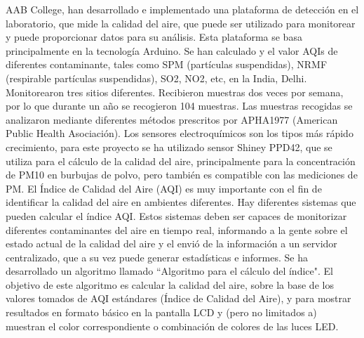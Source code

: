 \documentclass[10pt,a4paper]{article}
\begin{document}
\begin{multicols}{2}
\begin{itemize}
AAB College, han desarrollado e implementado una
plataforma de detección en el laboratorio, que mide la
calidad del aire, que puede ser utilizado para monitorear
y puede proporcionar datos para su análisis. Esta
plataforma se basa principalmente en la tecnología  Arduino.
Se han calculado y el valor AQIs de diferentes
contaminante, tales como SPM (partículas suspendidas),
NRMF (respirable partículas suspendidas), SO2,
NO2, etc, en la India, Delhi. Monitorearon tres sitios
diferentes. Recibieron muestras dos veces por semana,
por lo que durante un año se recogieron 104 muestras.
Las muestras recogidas se analizaron mediante diferentes
métodos prescritos por APHA1977 (American Public
Health Asociación). Los sensores electroquímicos
son los tipos más rápido crecimiento, para este proyecto
se ha utilizado sensor Shiney PPD42, que se utiliza
para el cálculo de la calidad del aire, principalmente
para la concentración de PM10 en burbujas de polvo,
pero también es compatible con las mediciones de PM.
El Índice de Calidad del Aire (AQI) es muy importante
con el fin de identificar la calidad del aire en ambientes
diferentes. Hay diferentes sistemas que pueden calcular
el índice AQI. Estos sistemas deben ser capaces de
monitorizar diferentes contaminantes del aire en tiempo
real, informando a la gente sobre el estado actual
de la calidad del aire y el envió de la información a un
servidor centralizado, que a su vez puede generar estadísticas e informes. Se ha desarrollado un algoritmo
llamado ``Algoritmo para el cálculo del índice". El objetivo
de este algoritmo es calcular la calidad del aire,
sobre la base de los valores tomados de AQI estándares
(Índice de Calidad del Aire), y para mostrar resultados
en formato básico en la pantalla LCD y (pero no
limitados a) muestran el color correspondiente o combinación
 de colores de las luces LED.


\end{itemize}
\end{multicols}
\end{document}
